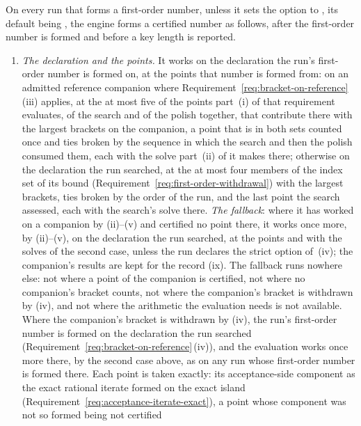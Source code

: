 \begin{requirement}\label{req:certified-evaluation}
On every run that forms a first-order number, unless it sets the option
 to , its default being ,
the engine forms a certified number as follows, after the first-order number
is formed and before a key length is reported.
\begin{enumerate}[label=(\roman*),leftmargin=2.4em]
\item \emph{The declaration and the points.} It works on the declaration the
  run's first-order number is formed on, at the points that number is formed
  from: on an admitted reference companion where
  Requirement~\ref{req:bracket-on-reference}\,(iii) applies, at the at most
  five of the points part~(i) of that requirement evaluates, of the search
  and of the polish together, that contribute there with the largest
  brackets on the companion, a point that is in both sets counted once and
  ties broken by the sequence in which the search and then the polish
  consumed them, each with the solve part~(ii) of it
  makes there; otherwise on the declaration the run searched, at the at most
  four members of the index set of its bound
  (Requirement~\ref{req:first-order-withdrawal}) with the largest brackets,
  ties broken by the order of the run, and the last point the search
  assessed, each with the search's solve there. \emph{The fallback}: where it
  has worked on a companion by (ii)--(v) and certified no point there, it
  works once more, by (ii)--(v), on the declaration the run searched, at the
  points and with the solves of the second case, unless the run declares the
  strict option  of
  \,(iv); the companion's results are
  kept for the record (ix). The fallback runs nowhere else: not where a point
  of the companion is certified, not where no companion's bracket counts, not
  where the companion's bracket is withdrawn by (iv), and not where the
  arithmetic the evaluation needs is not available. Where the companion's
  bracket is withdrawn by (iv), the run's first-order number is formed on the
  declaration the run searched (Requirement~\ref{req:bracket-on-reference}\,(iv)),
  and the evaluation works once more there, by the second case above, as on
  any run whose first-order number is formed there. Each point
  is taken exactly: its acceptance-side component as the exact rational
  iterate formed on the exact island
  (Requirement~\ref{req:acceptance-iterate-exact}), a point whose component
  was not so formed being not certified

\end{enumerate}
\end{requirement}
